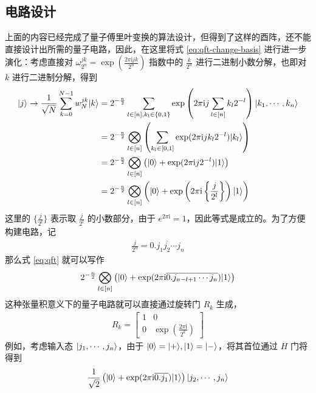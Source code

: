\subsection{电路设计}

上面的内容已经完成了量子傅里叶变换的算法设计，但得到了这样的酉阵，还不能直接设计出所需的量子电路，因此，在这里将式 \ref{eq:qft-change-basis} 进行进一步演化：考虑直接对 $\omega_{2^n}^{jk}=\exp(\frac{2\pi\mathrm{i} jk}{2^n})$ 指数中的 $\frac{k}{2^n}$ 进行二进制小数分解，也即对 $k$ 进行二进制分解，得到 \begin{align}\begin{aligned}
        |j\rangle\to\frac{1}{\sqrt{N}}\sum_{k=0}^{N-1}w_N^{jk}|k\rangle
         & =2^{-\frac{n}{2}}\sum_{l\in[n],k_l\in\{0,1\}}\exp\left(2\pi\mathrm{i} j\sum_{l\in[n]}k_l2^{-l}\right)|k_1,\cdots,k_n\rangle                  \\
         & =2^{-\frac{n}{2}}\bigotimes_{l\in[n]}\left(\sum_{k_l\in[0,1]}\exp(2\pi\mathrm{i} jk_l2^{-l})|k_l\rangle\right)                               \\
         & =2^{-\frac{n}{2}}\bigotimes_{l\in[n]}\left(|0\rangle+\exp(2\pi\mathrm{i} j2^{-l})|1\rangle\right)                                              \\
         & =2^{-\frac{n}{2}}\bigotimes_{l\in[n]}\left(|0\rangle+\exp\left(2\pi\mathrm{i}\left\{\frac{j}{2^l}\right\}\right)|1\rangle\right)\label{eq:qft}
    \end{aligned}\end{align}
这里的 $\{\frac{j}{2^l}\}$ 表示取 $\frac{j}{2^l}$ 的小数部分，由于 $e^{2\pi\mathrm{i}}=1$，因此等式是成立的。为了方便构建电路，记 \begin{align*}
    \frac{j}{2^n}=\overline{0.j_1 j_2\cdots j_n}
\end{align*}
那么式 \ref{eq:qft} 就可以写作 \begin{align*}
    2^{-\frac{n}{2}}\bigotimes_{l\in[n]}\left(|0\rangle+\exp(2\pi\mathrm{i}\overline{0.j_{n-l+1}\cdots j_{n}})|1\rangle\right)
\end{align*}
这种张量积意义下的量子电路就可以直接通过旋转门 $R_k$ 生成，\begin{align*}
    R_k=\begin{bmatrix}
            1 & 0                                           \\
            0 & \exp\left(\frac{2\pi\mathrm{i}}{2^k}\right)
        \end{bmatrix}
\end{align*}
例如，考虑输入态 $|j_1,\cdots,j_n\rangle$，由于 $|0\rangle=|+\rangle,|1\rangle=|-\rangle$，将其首位通过 $H$ 门将得到 \begin{align*}
    \frac{1}{\sqrt{2}}\left(|0\rangle+\exp(2\pi\mathrm{i}\overline{0.j_1})|1\rangle\right)|j_2,\cdots,j_n\rangle
\end{align*}
